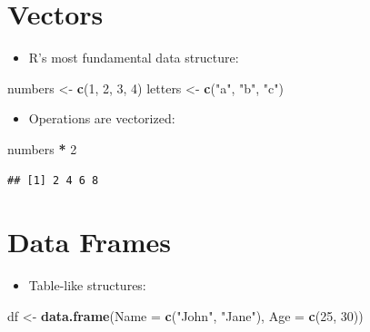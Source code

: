 \documentclass[
]{book}
\newenvironment{Shaded}{\begin{snugshade}}{\end{snugshade}}
\newcommand{\AttributeTok}[1]{\textcolor[rgb]{0.13,0.29,0.53}{#1}}
\newcommand{\DecValTok}[1]{\textcolor[rgb]{0.00,0.00,0.81}{#1}}
\newcommand{\FunctionTok}[1]{\textcolor[rgb]{0.13,0.29,0.53}{\textbf{#1}}}
\newcommand{\NormalTok}[1]{#1}
\newcommand{\OtherTok}[1]{\textcolor[rgb]{0.56,0.35,0.01}{#1}}
\newcommand{\SpecialCharTok}[1]{\textcolor[rgb]{0.81,0.36,0.00}{\textbf{#1}}}
\newcommand{\StringTok}[1]{\textcolor[rgb]{0.31,0.60,0.02}{#1}}
\providecommand{\tightlist}{%
  \setlength{\itemsep}{0pt}\setlength{\parskip}{0pt}}
\begin{document}
\hypertarget{vectors}{%
\section{Vectors}\label{vectors}}

\begin{itemize}
\tightlist
\item
  R's most fundamental data structure:
\end{itemize}

\begin{Shaded}
\begin{Highlighting}[]
\NormalTok{numbers }\OtherTok{\textless{}{-}} \FunctionTok{c}\NormalTok{(}\DecValTok{1}\NormalTok{, }\DecValTok{2}\NormalTok{, }\DecValTok{3}\NormalTok{, }\DecValTok{4}\NormalTok{)}
\NormalTok{letters }\OtherTok{\textless{}{-}} \FunctionTok{c}\NormalTok{(}\StringTok{"a"}\NormalTok{, }\StringTok{"b"}\NormalTok{, }\StringTok{"c"}\NormalTok{)}
\end{Highlighting}
\end{Shaded}

\begin{itemize}
\tightlist
\item
  Operations are vectorized:
\end{itemize}

\begin{Shaded}
\begin{Highlighting}[]
\NormalTok{numbers }\SpecialCharTok{*} \DecValTok{2}
\end{Highlighting}
\end{Shaded}

\begin{verbatim}
## [1] 2 4 6 8
\end{verbatim}

\hypertarget{data-frames}{%
\section{Data Frames}\label{data-frames}}

\begin{itemize}
\tightlist
\item
  Table-like structures:
\end{itemize}

\begin{Shaded}
\begin{Highlighting}[]
\NormalTok{df }\OtherTok{\textless{}{-}} \FunctionTok{data.frame}\NormalTok{(}\AttributeTok{Name =} \FunctionTok{c}\NormalTok{(}\StringTok{"John"}\NormalTok{, }\StringTok{"Jane"}\NormalTok{), }\AttributeTok{Age =} \FunctionTok{c}\NormalTok{(}\DecValTok{25}\NormalTok{, }\DecValTok{30}\NormalTok{))}
\end{Highlighting}
\end{Shaded}
\end{document}
